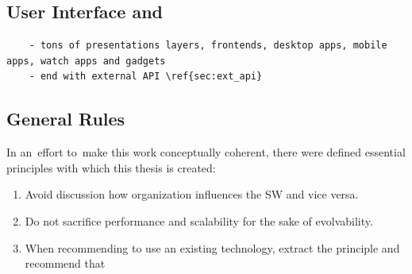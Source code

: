 \documentclass[thesis=M,english,hidelinks]{FITthesis}[2012/10/20]
\begin{document}
\subsection{User Interface and }
\begin{verbatim}
    - tons of presentations layers, frontends, desktop apps, mobile apps, watch apps and gadgets 
    - end with external API \ref{sec:ext_api}
\end{verbatim}

\subsection{General Rules}
In an~effort to~make this work conceptually coherent, there were defined essential principles with which this thesis is created:
\begin{enumerate}
    \item Avoid discussion how organization influences the \acrshort{SW} and vice versa.
    \item Do not sacrifice performance and scalability for the sake of evolvability.
    \item When recommending to use an existing technology, extract the principle and recommend that 
\end{enumerate}
\end{document}
